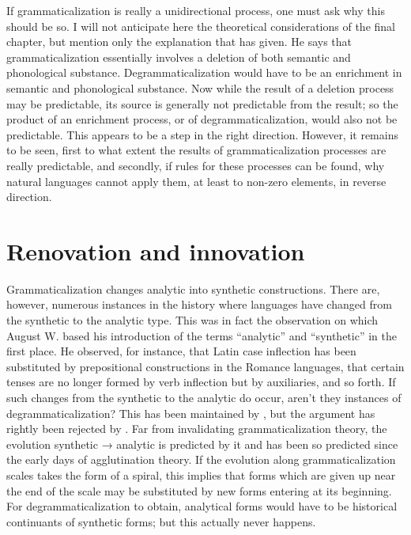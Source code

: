 If grammaticalization is really a unidirectional process, one must ask why this should be so. I will not anticipate here the theoretical considerations of the final chapter, but mention only the explanation that \citet[96]{Givón1975} has given. He says that grammaticalization essentially involves a deletion of both semantic and phonological substance. Degrammaticalization would have to be an enrichment in semantic and phonological substance. Now while the result of a deletion process may be predictable, its source is generally not predictable from the result; so the product of an enrichment process, or of degrammaticalization, would also not be predictable. This appears to be a step in the right direction. However, it remains to be seen, first to what extent the results of grammaticalization processes are really predictable, and secondly, if rules for these processes can be found, why natural languages cannot apply them, at least to non-zero elements, in reverse direction.

\section{Renovation and innovation}

Grammaticalization changes analytic into synthetic constructions. There are, however, numerous instances in the history where languages have changed from the synthetic to the analytic type. This was in fact the observation on which August W. \citet[14--30]{Schlegel1818} based his introduction of the terms ``analytic'' and ``synthetic'' in the first place. He observed, for instance, that Latin case inflection has been substituted by prepositional constructions in the Romance languages, that certain tenses are no longer formed by verb inflection but by auxiliaries, and so forth. If such changes from the synthetic to the analytic do occur, aren't they instances of degrammaticalization? This has been maintained by \citet[223--225]{Lightfoot1979}, but the argument has rightly been rejected by \citet[75f]{HeineEtAl1984}. Far from invalidating grammaticalization theory, the evolution synthetic → analytic is predicted by it and has been so predicted since the early days of agglutination theory. If the evolution along grammaticalization scales takes the form of a spiral, this implies that forms which are given up near the end of the scale may be substituted by new forms entering at its beginning. For degrammaticalization to obtain, analytical forms would have to be historical continuants of synthetic forms; but this actually never happens.

